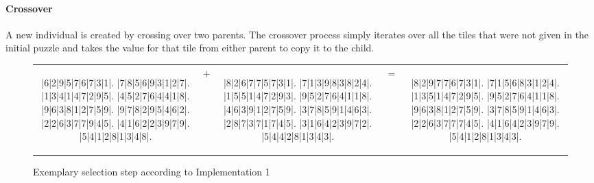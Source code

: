 \paragraph{Crossover} A new individual is created by crossing over two parents. The crossover process simply iterates over all the tiles that were not given in the initial puzzle and takes the value for that tile from either parent to copy it to the child.

\begin{figure}[H]
  \centering
  {\setlength{\tabcolsep}{-9pt}
  \renewcommand{\arraystretch}{1.5}
   \begin{tabular}{c c c c c}
    \begin{adjustbox}{width=0.38\textwidth,valign=c}
      \begin{minipage}{\linewidth}
        \begin{sudoku}
        |6|2|9|5|7|6|7|3|1|.
        |7|8|5|6|9|3|1|2|7|.
        |1|3|4|1|4|7|2|9|5|.
        |4|5|2|7|6|4|4|1|8|.
        |9|6|3|8|1|2|7|5|9|.
        |9|7|8|2|9|5|4|6|2|.
        |2|2|6|3|7|7|9|4|5|.
        |4|1|6|2|2|3|9|7|9|.
        |5|4|1|2|8|1|3|4|8|.
        \end{sudoku}
      \end{minipage}
    \end{adjustbox}
    & %
    {\begin{adjustbox}{valign=c}\Large$+$\end{adjustbox}}
    &
    \begin{adjustbox}{width=0.38\textwidth,valign=c}
      \begin{minipage}{\linewidth}
        \begin{sudoku}
        |8|2|6|7|7|5|7|3|1|.
        |7|1|3|9|8|3|8|2|4|.
        |1|5|5|1|4|7|2|9|3|.
        |9|5|2|7|6|4|1|1|8|.
        |4|6|3|9|1|2|7|5|9|.
        |3|7|8|5|9|1|4|6|3|.
        |2|8|7|3|7|1|7|4|5|.
        |3|1|6|4|2|3|9|7|2|.
        |5|4|4|2|8|1|3|4|3|.
        \end{sudoku}
      \end{minipage}
    \end{adjustbox}
    & %
    {\begin{adjustbox}{valign=c}\Large$=$\end{adjustbox}}
    &
    \begin{adjustbox}{width=0.38\textwidth,valign=c}
      \begin{minipage}{\linewidth}
        \begin{sudoku}
        |8|2|9|7|7|6|7|3|1|.
        |7|1|5|6|8|3|1|2|4|.
        |1|3|5|1|4|7|2|9|5|.
        |9|5|2|7|6|4|1|1|8|.
        |9|6|3|8|1|2|7|5|9|.
        |3|7|8|5|9|1|4|6|3|.
        |2|2|6|3|7|7|7|4|5|.
        |4|1|6|4|2|3|9|7|9|.
        |5|4|1|2|8|1|3|4|3|.
        \end{sudoku}
      \end{minipage}
    \end{adjustbox}
   \end{tabular}
  }
  \caption{Exemplary selection step according to Implementation 1}
  \label{fig:impl-1-selection}
\end{figure}

